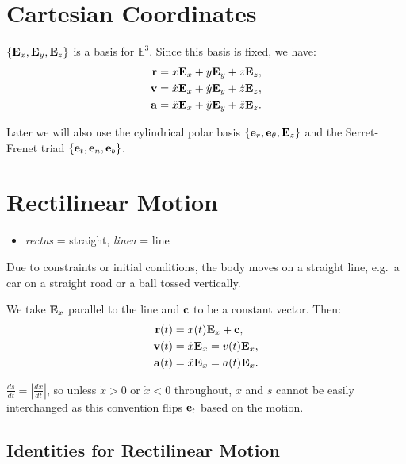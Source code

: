 \documentclass[
  letterpaper,
  DIV=11,
  numbers=noendperiod]{scrreprt}
\providecommand{\tightlist}{%
  \setlength{\itemsep}{0pt}\setlength{\parskip}{0pt}}
\begin{document}
\section{Cartesian Coordinates}\label{cartesian-coordinates}

\(\{{\bf E}_x,{\bf E}_y,{\bf E}_z\}\) is a basis for \(\mathbb{E}^3\).
Since this basis is fixed, we have: \begin{align}
    {\bf r} &= x{\bf E}_x+y{\bf E}_y+z{\bf E}_z,\\
    {\bf v} &= \dot{x}{\bf E}_x+\dot{y}{\bf E}_y+\dot{z}{\bf E}_z,\\
    {\bf a} &= \ddot{x}{\bf E}_x+\ddot{y}{\bf E}_y+\ddot{z}{\bf E}_z.
\end{align}

Later we will also use the cylindrical polar basis
\(\{{\bf e}_r,{\bf e}_\theta,{\bf E}_z\}\) and the Serret-Frenet triad
\(\{{\bf e}_t,{\bf e}_n,{\bf e}_b\}\).

\section{Rectilinear Motion}\label{rectilinear-motion}

\begin{itemize}
\tightlist
\item
  \emph{rectus} = straight, \emph{linea} = line
\end{itemize}

Due to constraints or initial conditions, the body moves on a straight
line, e.g.~a car on a straight road or a ball tossed vertically.

We take \({\bf E}_x\) parallel to the line and \({\bf c}\) to be a
constant vector. Then: \begin{align}
    {\bf r}(t) &= x(t){\bf E}_x+{\bf c},\\
    {\bf v}(t) &= \dot{x}{\bf E}_x = v(t){\bf E}_x,\\
    {\bf a}(t) &= \ddot{x}{\bf E}_x = a(t){\bf E}_x.
\end{align}

\(\frac{ds}{dt}=\left|\frac{dx}{dt}\right|\), so unless \(\dot{x}>0\) or
\(\dot{x}<0\) throughout, \(x\) and \(s\) cannot be easily interchanged
as this convention flips \({\bf e}_t\) based on the motion.

\subsection{Identities for Rectilinear
Motion}\label{identities-for-rectilinear-motion}
\end{document}

